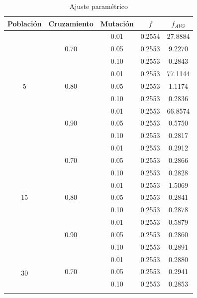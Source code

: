 \documentclass[journal]{IEEEtran}
\begin{document}
\begin{table}[h]
\caption{Ajuste paramétrico}
\centering
\begin{tabular}{|c|c|c||c|c|}
\hline
Población &Cruzamiento &Mutación &$f$ &$f_{AVG}$ \\
\hline
\multirow{9}{*}{5}  & \multirow{3}{*}{0.70} & 0.01 & 0.2554 & 27.8884 \\
                    &                       & 0.05 & 0.2553 & 9.2270 \\
                    &                       & 0.10 & 0.2553 & 0.2843 \\ \cline{2-5}
                    & \multirow{3}{*}{0.80} & 0.01 & 0.2553 & 77.1144 \\
                    &                       & 0.05 & 0.2553 & 1.1174 \\
                    &                       & 0.10 & 0.2553 & 0.2836 \\ \cline{2-5}
                    & \multirow{3}{*}{0.90} & 0.01 & 0.2553 & 66.8574 \\
                    &                       & 0.05 & 0.2553 & 0.5750 \\
                    &                       & 0.10 & 0.2553 & 0.2817 \\ \hline
\multirow{9}{*}{15} & \multirow{3}{*}{0.70} & 0.01 & 0.2553 & 0.2912 \\
                    &                       & 0.05 & 0.2553 & 0.2866 \\
                    &                       & 0.10 & 0.2553 & 0.2828 \\ \cline{2-5}
                    & \multirow{3}{*}{0.80} & 0.01 & 0.2553 & 1.5069 \\
                    &                       & 0.05 & 0.2553 & 0.2841 \\
                    &                       & 0.10 & 0.2553 & 0.2878 \\ \cline{2-5}
                    & \multirow{3}{*}{0.90} & 0.01 & 0.2553 & 0.5879 \\
                    &                       & 0.05 & 0.2553 & 0.2860 \\
                    &                       & 0.10 & 0.2553 & 0.2891 \\ \hline
\multirow{9}{*}{30} & \multirow{3}{*}{0.70} & 0.01 & 0.2553 & 0.2880 \\
                    &                       & 0.05 & 0.2553 & 0.2941 \\
                    &                       & 0.10 & 0.2553 & 0.2853 \\ \cline{2-5}

\end{tabular}
\end{table}
\end{document}
